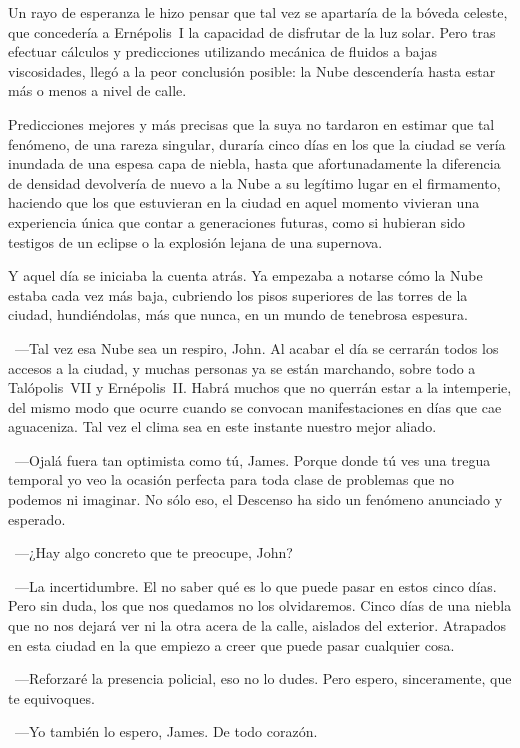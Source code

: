 Un rayo de esperanza le hizo pensar que tal vez se apartaría de la bóveda celeste, que concedería a Ernépolis~I la capacidad de disfrutar de la luz solar. Pero tras efectuar cálculos y predicciones utilizando mecánica de fluidos a bajas viscosidades, llegó a la peor conclusión posible: la Nube descendería hasta estar más o menos a nivel de calle.

Predicciones mejores y más precisas que la suya no tardaron en estimar que tal fenómeno, de una rareza singular, duraría cinco días en los que la ciudad se vería inundada de una espesa capa de niebla, hasta que afortunadamente la diferencia de densidad devolvería de nuevo a la Nube a su legítimo lugar en el firmamento, haciendo que los que estuvieran en la ciudad en aquel momento vivieran una experiencia única que contar a generaciones futuras, como si hubieran sido testigos de un eclipse o la explosión lejana de una supernova.

Y aquel día se iniciaba la cuenta atrás. Ya empezaba a notarse cómo la Nube estaba cada vez más baja, cubriendo los pisos superiores de las torres de la ciudad, hundiéndolas, más que nunca, en un mundo de tenebrosa espesura.

~---Tal vez esa Nube sea un respiro, John. Al acabar el día se cerrarán todos los accesos a la ciudad, y muchas personas ya se están marchando, sobre todo a Talópolis~VII y Ernépolis~II. Habrá muchos que no querrán estar a la intemperie, del mismo modo que ocurre cuando se convocan manifestaciones en días que cae aguaceniza. Tal vez el clima sea en este instante nuestro mejor aliado.

~---Ojalá fuera tan optimista como tú, James. Porque donde tú ves una tregua temporal yo veo la ocasión perfecta para toda clase de problemas que no podemos ni imaginar. No sólo eso, el Descenso ha sido un fenómeno anunciado y esperado.

~---¿Hay algo concreto que te preocupe, John?

~---La incertidumbre. El no saber qué es lo que puede pasar en estos cinco días. Pero sin duda, los que nos quedamos no los olvidaremos. Cinco días de una niebla que no nos dejará ver ni la otra acera de la calle, aislados del exterior. Atrapados en esta ciudad en la que empiezo a creer que puede pasar cualquier cosa.

~---Reforzaré la presencia policial, eso no lo dudes. Pero espero, sinceramente, que te equivoques.

~---Yo también lo espero, James. De todo corazón.

